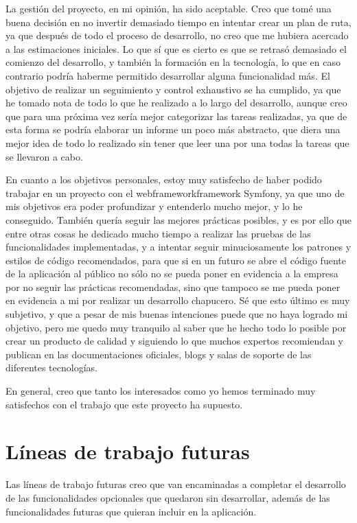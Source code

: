 La gestión del proyecto, en mi opinión, ha sido aceptable. Creo que tomé una buena
decisión en no invertir demasiado tiempo en intentar crear un plan de ruta, ya que
después de todo el proceso de desarrollo, no creo que me hubiera acercado a las
estimaciones iniciales. Lo que sí que es cierto es que se retrasó demasiado el
comienzo del desarrollo, y también la formación en la tecnología, lo que en caso
contrario podría haberme permitido desarrollar alguna funcionalidad más. El objetivo
de realizar un seguimiento y control exhaustivo se ha cumplido, ya que he tomado nota
de todo lo que he realizado a lo largo del desarrollo, aunque creo que para una
próxima vez sería mejor categorizar las tareas realizadas, ya que de esta forma
se podría elaborar un informe un poco más abstracto, que diera una mejor idea de
todo lo realizado sin tener que leer una por una todas la tareas que se llevaron a cabo.

En cuanto a los objetivos personales, estoy muy satisfecho de haber podido
trabajar en un proyecto con el \gls{webframework}{framework} Symfony, ya que uno
de mis objetivos era poder profundizar y entenderlo mucho mejor, y lo he conseguido.
También quería seguir las mejores prácticas posibles, y es por ello que entre otras
cosas he dedicado mucho tiempo a realizar las pruebas de las funcionalidades
implementadas, y a intentar seguir minuciosamente los patrones y estilos de código
recomendados, para que si en un futuro se abre el código fuente de la aplicación al público
no sólo no se pueda poner en evidencia a la empresa por no seguir las prácticas recomendadas,
sino que tampoco se me pueda poner en evidencia a mi por realizar un desarrollo chapucero. Sé
que esto último es muy subjetivo, y que a pesar de mis buenas intenciones puede que
no haya logrado mi objetivo, pero me quedo muy
tranquilo al saber que he hecho todo lo posible por crear un producto de calidad y
siguiendo lo que muchos expertos recomiendan y publican en las documentaciones
oficiales, blogs y salas de soporte de las diferentes tecnologías.

En general, creo que tanto los interesados como yo hemos terminado muy satisfechos
con el trabajo que este proyecto ha supuesto.

\section{Líneas de trabajo futuras}
Las líneas de trabajo futuras creo que van encaminadas a completar el desarrollo
de las funcionalidades opcionales que quedaron sin desarrollar, además de las
funcionalidades futuras que quieran incluir en la aplicación.

